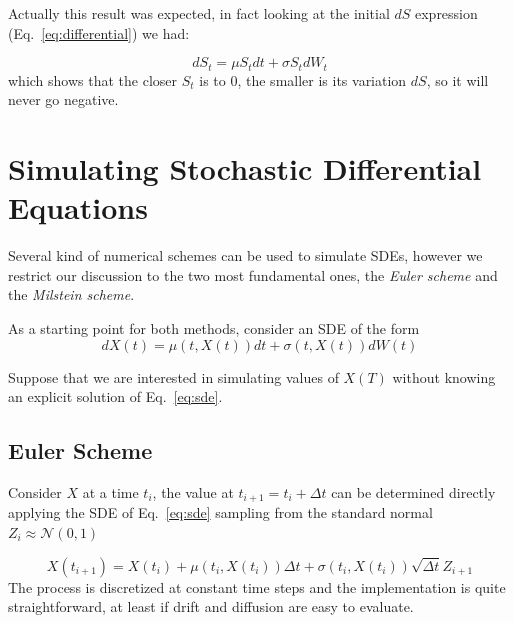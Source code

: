 Actually this result was expected, in fact looking at the initial $dS$ expression (Eq.~\ref{eq:differential}) we had:

\begin{equation}
dS_t = \mu S_tdt + \sigma S_t dW_t
\end{equation}
which shows that the closer $S_t$ is to 0, the smaller is its variation $dS$, so it will never go negative.

\section {Simulating Stochastic Differential Equations}
Several kind of numerical schemes can be used to simulate SDEs, however we restrict our discussion to the two most fundamental ones, the \emph{Euler scheme} and the \emph{Milstein scheme}. 

As a starting point for both methods, consider an SDE of the form
\begin{equation}
dX(t) = \mu(t, X(t))dt + \sigma(t, X(t)) dW (t)
\label{eq:sde}
\end{equation}

Suppose that we are interested in simulating values of $X(T)$ without knowing an explicit solution of Eq.~\ref{eq:sde}. 

\subsection{Euler Scheme}
Consider $X$ at a time $t_i$, the value at $t_{i+1} = t_i +\Delta t$ can be determined directly applying the SDE of Eq.~\ref{eq:sde} sampling from the standard normal $Z_i \approx \mathcal{N}(0,1)$

\begin{equation}
X(t_{i+1}) = X(t_i) + \mu(t_i , X(t_i))\Delta t + \sigma(t_i , X(t_i))\sqrt{\Delta t}Z_{i+1}
\label{eq:euler_scheme}
\end{equation}
The process is discretized at constant time steps and the implementation is quite straightforward, at least if drift and diffusion are easy to evaluate.

